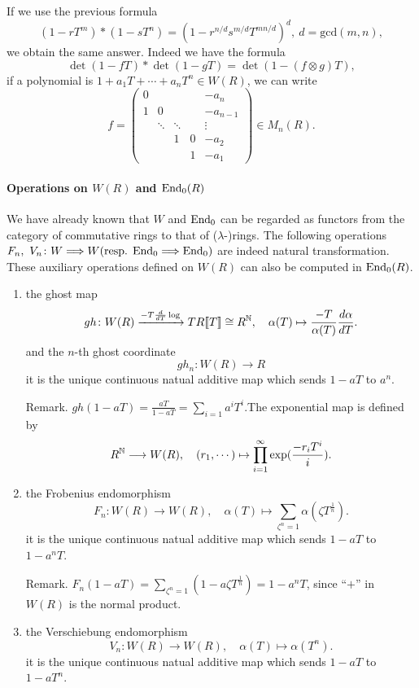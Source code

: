 If we use the previous formula 
\[(1-rT^m)*(1-sT^n)=(1-r^{n/d}s^{m/d}T^{mn/d})^d,\ d=\mbox{gcd}(m,n),\]
we obtain the same answer. Indeed we have the formula 
\[\det (1-fT)*\det(1-gT)=\det(1-(f\otimes g)T),\]
if a polynomial is $1 + a_1T+ \cdots + a_nT^n\in W(R)$, we can write 
\[f=\begin{pmatrix}
	0& & & & -a_n\\
	1&0& & & -a_{n-1}\\
	 &\ddots&\ddots& &\vdots\\
	 & & 1&0&-a_2\\
	 & & & 1&-a_1 
\end{pmatrix}\in M_n(R).\]

\paragraph{Operations on $W(R)$ and $\mathrm{End}_0(R)$}
We have already known that $W$ and $\mathrm{End}_0$ can be regarded as functors from the category of commutative rings to that of ($\lambda$-)rings. The following operations $F_n,\  V_n \colon W \Longrightarrow W (\mbox{resp. }\mathrm{End}_0 \Longrightarrow \mathrm{End}_0) $ are indeed natural transformation.
These auxiliary operations defined on $W(R)$ can also be computed in $\mathrm{End}_0(R)$.
\begin{enumerate}
	\item the ghost map 
	\[gh \colon W(R) \xrightarrow{-T\frac{d}{dT}\log} TR\llbracket T\rrbracket  \cong R^{\mathbb{N}},\quad \alpha(T)\mapsto \frac{-T}{\alpha(T)} \frac{d\alpha}{d T}. \] 
	and  the $n$-th ghost coordinate 
	\[gh_n \colon W(R)\longrightarrow R\]
	it is the unique continuous natual additive map which sends $1-aT$ to $a^n$.

	Remark. $gh(1-aT)=\frac{aT}{1-aT}=\sum_{i=1} a^iT^i$.The exponential map is defined by
	\[R^{\mathbb{N}}\longrightarrow W(R),\quad (r_1,\cdots) \mapsto \prod_{i=1}^\infty \exp (\frac{-r_i T^i}{i}). \]
	

	\item the Frobenius endomorphism
	\[F_n \colon W(R)\longrightarrow W(R),\quad \alpha(T)\mapsto \sum_{\zeta^n=1}\alpha(\zeta T^{\frac{1}{n}}). \]
	it is the unique continuous natual additive map which sends $1-aT$ to $1-a^nT$.

	Remark. $F_n(1-aT)=\sum_{\zeta^n=1}(1-a\zeta T^{\frac{1}{n}})=1-a^nT $, since ``$+$'' in $W(R)$ is the normal product.

	\item the Verschiebung endomorphism
	\[V_n \colon W(R)\longrightarrow W(R),\quad \alpha(T)\mapsto \alpha(T^n). \]
	it is the unique continuous natual additive map which sends $1-aT$ to $1-aT^n$.
\end{enumerate}
